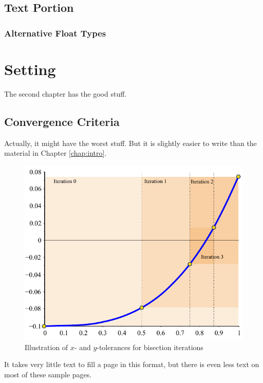 \documentclass[thesis]{./tex/thesis-umich}
\begin{document}
\section{Text Portion}


\subsection{Alternative Float Types}  \label{ssec:float}



\chapter{Setting}
The second chapter has the good stuff.

\section{Convergence Criteria}
Actually, it might have the worst stuff.  But it is slightly easier to
write than the material in Chapter \ref{chap:intro}.

\begin{figure}
 \begin{center}
  \includegraphics[scale=1]{./pics/f1_tol.pdf}
 \end{center}
 \caption{ \label{fig:fn:tol}
  Illustration of $x$- and $y$-tolerances for bisection iterations}
\end{figure}

\newpage

It takes very little text to fill a page in this format, but there is even less text on most of these sample pages.
\end{document}
